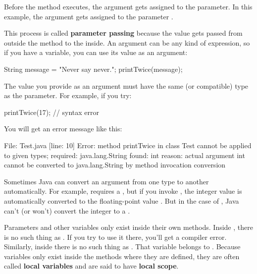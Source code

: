 Before the method executes, the argument gets assigned to the parameter.
In this example, the argument  gets assigned to the parameter .


This process is called {\bf parameter passing} because the value gets passed from outside the method to the inside.
An argument can be any kind of expression, so if you have a  variable, you can use its value as an argument:

\begin{code}
String message = "Never say never.";
printTwice(message);
\end{code}

The value you provide as an argument must have the same (or compatible) type as the parameter.
For example, if you try:

\begin{code}
printTwice(17);  // syntax error
\end{code}

You will get an error message like this:

\begin{stdout}
File: Test.java  [line: 10]
Error: method printTwice in class Test cannot be applied
       to given types;
  required: java.lang.String
  found: int
  reason: actual argument int cannot be converted to
          java.lang.String by method invocation conversion
\end{stdout}

Sometimes Java can convert an argument from one type to another automatically.
For example,  requires a , but if you invoke , the integer value  is automatically converted to the floating-point value .
But in the case of , Java can't (or won't) convert the integer  to a .


Parameters and other variables only exist inside their own methods.
Inside , there is no such thing as .
If you try to use it there, you'll get a compiler error.
Similarly, inside  there is no such thing as .
That variable belongs to .
Because variables only exist inside the methods where they are defined, they are often called {\bf local variables} and are said to have {\bf local scope}.


